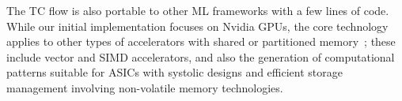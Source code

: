The TC flow is also portable to other ML frameworks with a few lines
of code. While our initial implementation focuses on Nvidia GPUs, the
core technology applies to other types of accelerators with shared or
partitioned
memory~\cite{RStream,PouchetFPGA,PPCG2013,YukiDistributed13}; these
include vector and SIMD accelerators, and also the generation of
computational patterns suitable for ASICs with systolic designs and
efficient storage management involving non-volatile memory
technologies.
